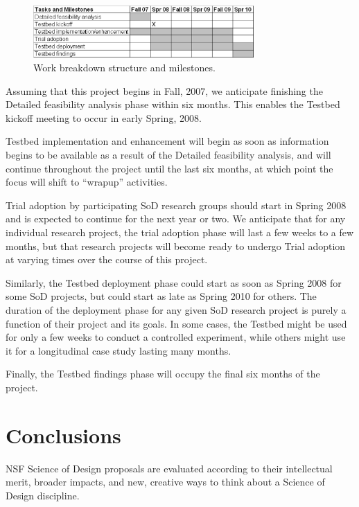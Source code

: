 \begin{figure}[ht]
  \centering
  \includegraphics[width=0.75\textwidth]{workstructure.eps}
  \caption{Work breakdown structure and milestones.} 
  \label{fig:wbs}
\end{figure}

Assuming that this project begins in Fall, 2007, we anticipate finishing the Detailed feasibility
analysis phase within six months.  This enables the Testbed kickoff meeting to occur in early 
Spring, 2008.  

Testbed implementation and enhancement will begin as soon as information begins to be available
as a result of the Detailed feasibility analysis, and will continue throughout the project until 
the last six months, at which point the focus will shift to ``wrapup'' activities. 

Trial adoption by participating SoD research groups should start in Spring 2008 and is expected
to continue for the next year or two.  We anticipate that for any individual research project,
the trial adoption phase will last a few weeks to a few months, but that research projects will
become ready to undergo Trial adoption at varying times over the course of this project.

Similarly, the Testbed deployment phase could start as soon as Spring 2008 for some SoD
projects, but could start as late as Spring 2010 for others.  The duration of the deployment 
phase for any given SoD research project is purely a function of their project and its goals. 
In some cases, the Testbed might be used for only a few weeks to conduct a controlled experiment, 
while others might use it for a longitudinal case study lasting many months. 

Finally, the Testbed findings phase will occupy the final six months of the project. 

\section{Conclusions}
\label{sec:merit}

NSF Science of Design proposals are evaluated according to their
intellectual merit, broader impacts, and new, creative ways to think about
a Science of Design discipline.

